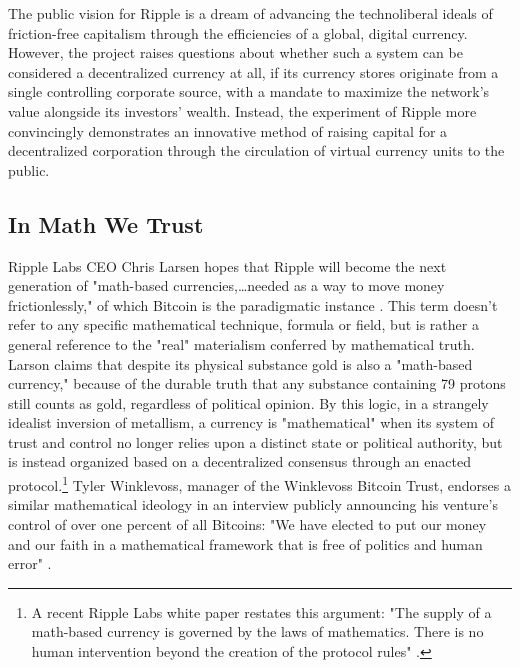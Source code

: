 The public vision for Ripple is a dream of advancing the technoliberal ideals of friction-free capitalism through the efficiencies of a global, digital currency. However, the project raises questions about whether such a system can be considered a decentralized currency at all, if its currency stores originate from a single controlling corporate source, with a mandate to maximize the network's value alongside its investors' wealth. Instead, the experiment of Ripple more convincingly demonstrates an innovative method of raising capital for a decentralized corporation through the circulation of virtual currency units to the public.

\subsection*{In Math We Trust}
Ripple Labs CEO Chris Larsen hopes that Ripple will become the next generation of "math-based currencies,…needed as a way to move money frictionlessly," of which Bitcoin is the paradigmatic instance \autocite{RippleInterview}. This term doesn't refer to any specific mathematical technique, formula or field, but is rather a general reference to the "real" materialism conferred by mathematical truth. Larson claims that despite its physical substance gold is also a "math-based currency," because of the durable truth that any substance containing 79 protons still counts as gold, regardless of political opinion. By this logic, in a strangely idealist inversion of metallism, a currency is "mathematical" when its system of trust and control no longer relies upon a distinct state or political authority, but is instead organized based on a decentralized consensus through an enacted protocol.\footnote{ A recent Ripple Labs white paper restates this argument: "The supply of a math-based currency is governed by the laws of mathematics. There is no human intervention beyond the creation of the protocol rules" \autocite*[9]{RipplePrimer}.} Tyler Winklevoss, manager of the Winklevoss Bitcoin Trust, endorses a similar mathematical ideology in an interview publicly announcing his venture's control of over one percent of all Bitcoins: "We have elected to put our money and our faith in a mathematical framework that is free of politics and human error" \autocite{Popper-Winklevoss}.

